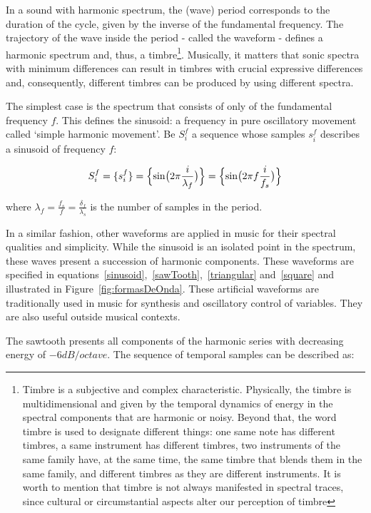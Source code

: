 \documentclass[
 aip,
 jmp,
 amsmath,amssymb,
 reprint,
]{revtex4-1}
\begin{document}
In a sound with harmonic spectrum, the (wave) period corresponds to the duration of the cycle, given by the inverse of the fundamental frequency. The trajectory of the wave inside the period - called the waveform - defines a harmonic spectrum and, thus, a timbre\footnote{Timbre is a subjective and complex characteristic. Physically, the timbre is multidimensional and given by the temporal dynamics of energy in the spectral components that are harmonic or noisy. Beyond that, the word timbre is used to designate different things: one same note has different timbres, a same instrument has different timbres, two instruments of the same family have, at the same time, the same timbre that blends them in the same family, and different timbres as they are different instruments. It is worth to mention that timbre is not always manifested in spectral traces, since cultural or circumstantial aspects alter our perception of timbre}. Musically, it matters that sonic spectra with minimum differences can result in timbres with crucial expressive differences and, consequently, different timbres can be produced by using different spectra\cite{Roederer}.

The simplest case is the spectrum that consists of only of the fundamental frequency $f$. This defines the sinusoid: a frequency in pure oscillatory movement called `simple harmonic movement'. Be $S_i^f$ a sequence whose samples $s_i^f$ describes a sinusoid of frequency $f$:

\begin{equation}\label{sinusoid}
     S^f_i=\{ s^f_i \}=\Bigl\{ \sin\bigl(2\pi \frac{i}{\lambda_f} \bigr)  \Bigr\} = \Bigl\{ \sin\bigl(2\pi f \frac{i}{f_s}\bigr)  \Bigr\} 
\end{equation}

where $\lambda_f=\frac{f_s}{f}=\frac{\delta_f}{\lambda_s}$  is the number of samples in the period.

In a similar fashion, other waveforms are applied in music for their spectral qualities and simplicity. While the sinusoid is an isolated point in the spectrum, these waves present a succession of harmonic components. These waveforms are specified in equations~\ref{sinusoid},~\ref{sawTooth},~\ref{triangular} and~\ref{square} and illustrated in Figure~\ref{fig:formasDeOnda}.
These artificial waveforms are traditionally used in music for synthesis and oscillatory control of variables. They are also useful outside musical contexts\cite{Openheim}.

The sawtooth presents all components of the harmonic series with decreasing energy of $-6dB/octave$. The sequence of temporal samples can be described as:
\end{document}
